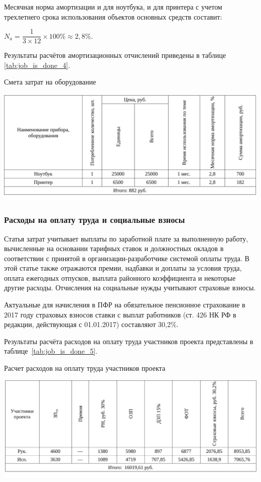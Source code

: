 Месячная норма амортизации и для ноутбука, и для принтера с учетом трехлетнего срока 
использования объектов основных средств составит:
\begin{center}
$ N_{a} = \dfrac{1}{3\times12}\times 100\% \approx 2,8\%.$\\
\end{center}

Результаты расчётов амортизационных отчислений приведены в таблице \ref{tab:job_is_done_4}.

\begin{table}[!ht]
\caption{Смета затрат на оборудование}
\centering
\includegraphics[page=1, width=1\linewidth]{tables/economics/schedule_4.pdf}
\label{tab:job_is_done_4}
\end{table}

\subsubsection{Расходы на оплату труда и социальные взносы}

Статья затрат учитывает выплаты по заработной плате за выполненную работу, 
вычисленные на основании тарифных ставок и должностных окладов в соответствии с принятой в 
организации-разработчике системой оплаты труда. В этой статье также отражаются премии, надбавки и доплаты за 
условия труда, оплата ежегодных отпусков, выплата районного коэффициента и некоторые другие расходы. 
Отчисления на социальные нужды учитывают страховые взносы.

Актуальные для начисления в ПФР на обязательное пенсионное страхование
в 2017 году страховых взносов ставки с выплат работников 
(ст. 426 НК РФ в редакции, действующая с 01.01.2017) составляют 30,2\%.

Результаты расчёта расходов на оплату труда участников проекта представлены в таблице~\ref{tab:job_is_done_5}.

\begin{table}[!ht]
\caption{Расчет расходов на оплату труда участников проекта}
\centering
\includegraphics[page=1, width=1\linewidth]{tables/economics/schedule_5.pdf}
\label{tab:job_is_done_5}
\end{table}


